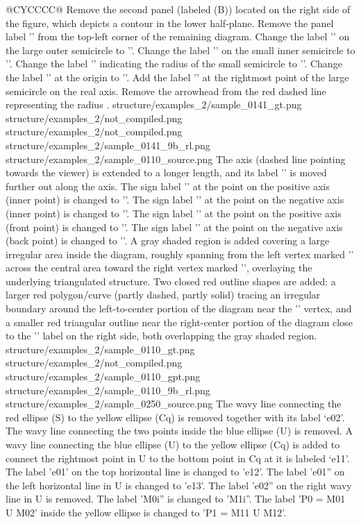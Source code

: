 \begin{table}[t]
\begin{tabularx}{\textwidth}{@{}CYCCCC@{}}
    {Remove the second panel (labeled (B)) located on the right side of the figure, which depicts a contour in the lower half-plane. Remove the panel label '' from the top-left corner of the remaining diagram. Change the label '' on the large outer semicircle to ''. Change the label '' on the small inner semicircle to ''. Change the label '\smath{\varepsilon}' indicating the radius of the small semicircle to ''. Change the label '' at the origin to ''. Add the label '' at the rightmost point of the large semicircle on the real axis. Remove the arrowhead from the red dashed line representing the radius .}
    {structure/examples_2/sample_0141_gt.png}
    {structure/examples_2/not_compiled.png}
    {structure/examples_2/not_compiled.png}
    {structure/examples_2/sample_0141_9b_rl.png}
    \midrule
    \exrowtwofive
    {structure/examples_2/sample_0110_source.png}
    {The  axis (dashed line pointing towards the viewer) is extended to a longer length, and its label '' is moved further out along the axis. The sign label '\smath{+}' at the point on the positive  axis (inner point) is changed to '\smath{-}'. The sign label '\smath{-}' at the point on the negative  axis (inner point) is changed to '\smath{+}'. The sign label '\smath{+}' at the point on the positive  axis (front point) is changed to '\smath{-}'. The sign label '\smath{+}' at the point on the negative  axis (back point) is changed to '\smath{-}'. A gray shaded region is added covering a large irregular area inside the diagram, roughly spanning from the left vertex marked '\smath{-}' across the central area toward the right vertex marked '\smath{+}', overlaying the underlying triangulated structure. Two closed red outline shapes are added: a larger red polygon/curve (partly dashed, partly solid) tracing an irregular boundary around the left-to-center portion of the diagram near the '\smath{-}' vertex, and a smaller red triangular outline near the right-center portion of the diagram close to the '\smath{-}' label on the right side, both overlapping the gray shaded region.}
    {structure/examples_2/sample_0110_gt.png}
    {structure/examples_2/not_compiled.png}
    {structure/examples_2/sample_0110_gpt.png}
    {structure/examples_2/sample_0110_9b_rl.png}
    \midrule
    \exrowtwosix
    {structure/examples_2/sample_0250_source.png}
    {The wavy line connecting the red ellipse (S) to the yellow ellipse (Cq) is removed together with its label ‘e02’. The wavy line connecting the two points inside the blue ellipse (U) is removed. A wavy line connecting the blue ellipse (U) to the yellow ellipse (Cq) is added to connect the rightmost point in U to the bottom point in Cq at it is labeled ‘e11’. The label 'e01' on the top horizontal line is changed to 'e12'. The label 'e01'' on the left horizontal line in U is changed to 'e13'. The label 'e02'' on the right wavy line in U is removed. The label 'M0i'' is changed to 'M1i''. The label 'P0 = M01 U M02' inside the yellow ellipse is changed to 'P1 = M11 U M12'.}

\end{tabularx}
\end{table}
